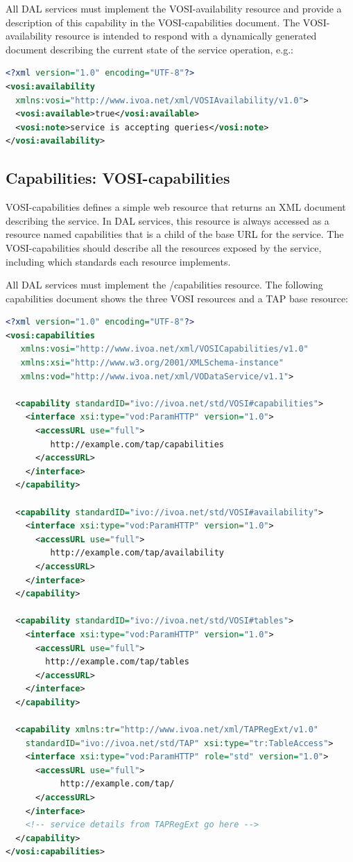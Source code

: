 \documentclass[11pt,letter]{ivoa}
\begin{document}
All DAL services must implement the VOSI-availability resource and provide a description
of this capability in the VOSI-capabilities document. The VOSI-availability resource is
intended to respond with a dynamically generated document describing the current state of the service
operation, e.g.:

\begin{lstlisting}[language=XML,basicstyle=\footnotesize]
<?xml version="1.0" encoding="UTF-8"?>
<vosi:availability
  xmlns:vosi="http://www.ivoa.net/xml/VOSIAvailability/v1.0">
  <vosi:available>true</vosi:available>
  <vosi:note>service is accepting queries</vosi:note>
</vosi:availability>
\end{lstlisting}

\subsection{Capabilities: VOSI-capabilities}
\label{sec:vosi-capabilities}
VOSI-capabilities \citep{2017ivoa.spec.0524G} defines a simple web resource that
returns an XML document
describing the service. In  DAL services, this resource is always accessed as a
resource named capabilities that is a child of the base URL for the service. The
VOSI-capabilities should describe all the resources exposed by the service,
including which standards each resource implements.

All DAL services must implement the /capabilities resource. The following
capabilities document shows the three VOSI resources and a TAP base resource:

\begin{lstlisting}[language=XML,basicstyle=\footnotesize]
<?xml version="1.0" encoding="UTF-8"?>
<vosi:capabilities
   xmlns:vosi="http://www.ivoa.net/xml/VOSICapabilities/v1.0"
   xmlns:xsi="http://www.w3.org/2001/XMLSchema-instance"
   xmlns:vod="http://www.ivoa.net/xml/VODataService/v1.1">

  <capability standardID="ivo://ivoa.net/std/VOSI#capabilities">
    <interface xsi:type="vod:ParamHTTP" version="1.0">
      <accessURL use="full">
         http://example.com/tap/capabilities
      </accessURL>
    </interface>
  </capability>

  <capability standardID="ivo://ivoa.net/std/VOSI#availability">
    <interface xsi:type="vod:ParamHTTP" version="1.0">
      <accessURL use="full">
         http://example.com/tap/availability
      </accessURL>
    </interface>
  </capability>

  <capability standardID="ivo://ivoa.net/std/VOSI#tables">
    <interface xsi:type="vod:ParamHTTP" version="1.0">
      <accessURL use="full">
        http://example.com/tap/tables
      </accessURL>
    </interface>
  </capability>

  <capability xmlns:tr="http://www.ivoa.net/xml/TAPRegExt/v1.0"
    standardID="ivo://ivoa.net/std/TAP" xsi:type="tr:TableAccess">
    <interface xsi:type="vod:ParamHTTP" role="std" version="1.0">
      <accessURL use="full">
           http://example.com/tap/
      </accessURL>
    </interface>
    <!-- service details from TAPRegExt go here -->
  </capability>
</vosi:capabilities>
\end{lstlisting}
\end{document}
